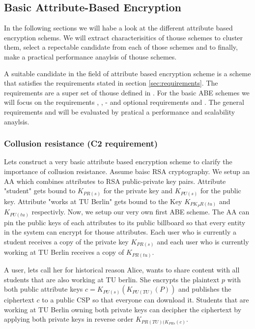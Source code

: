 \subsection{Basic Attribute-Based Encryption}
In the following sections we will habe a look at the different attribute based encryption schems. We will extract characterisitics of thouse schemes to cluster them, select a repectable candidate from each of those schemes and to finally, make a practical performance anaylsis of thouse schemes. 

A suitable candidate in the field of attribute based encryption scheme is a scheme that satisfies the requirements stated in section \ref{sec:requirements}. The requirements are a super set of thouse defined in \cite{lee2013survey}. For the basic \ac{ABE} schemes we will focus on the requirements , ,  -  and optional requirements  and .
The general requirements  and  will be evaluated by pratical a performance and scalability anaylsis.

\subsubsection{Collusion resistance (C2 requirement)}
Lets construct a very basic attribute based encryption scheme to clarify the importance of collusion resistance. Assume baisc \ac{RSA} cryptography. We setup an \ac{AA} which combines attributes to \ac{RSA} public-private key pairs. Attribute "student" gets bound to $K_{PR(s)}$ for the private key and $K_{PU(s)}$ for the public key. Attribute "works at TU Berlin" gets bound to the Key $K_{PK_PR(tu)}$ and $K_{PU(tu)}$ respectivly. Now, we setup our very own first ABE scheme. The AA can pin the public keys of each attributes to its public billboard so that every entity in the system can encrypt for thouse attributes. Each user who is currently a student receives a copy of the private key $K_{PR(s)}$ and each user who is currently working at TU Berlin receives a copy of $K_{PR(tu)}$. 

A user, lets call her for historical reason Alice, wants to share content with all students that are also working at TU berlin. She encrypts the plaintext $p$ with both public attribute keys $c = K_{PU(s)}(K_{PU(TU)}(P))$ and publishes the ciphertext $c$ to a public CSP so that everyone can download it. Students that are working at TU Berlin owning both private keys can decipher the ciphertext by applying both private keys in reverse order $K_{PR(TU)(K_{PR{s}}(c)}$.

